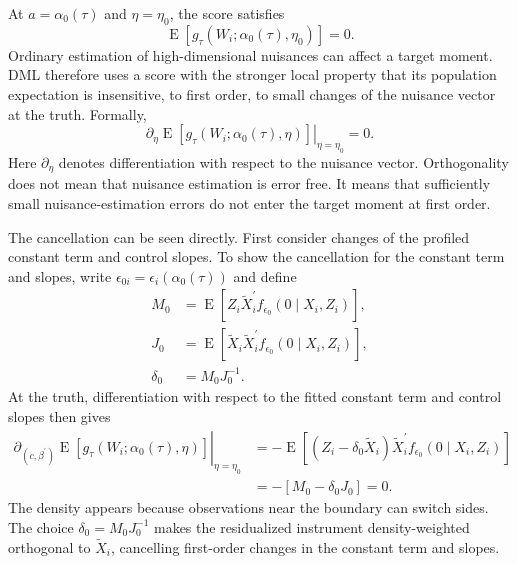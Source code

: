 At $a=\alpha_0(\tau)$ and $\eta=\eta_0$, the score satisfies
\begin{equation}
    \operatorname{E}\!\left[
        g_{\tau}\!\left(W_i;\alpha_0(\tau),\eta_0\right)
    \right]
    =0.
    \label{eq:orthogonal-score-moment}
\end{equation}
Ordinary estimation of high-dimensional nuisances can affect a target moment. DML therefore uses a score with the stronger local property that its population expectation is insensitive, to first order, to small changes of the nuisance vector at the truth. Formally,
\begin{equation}
    \left.
    \partial_{\eta}
    \operatorname{E}\!\left[
        g_{\tau}\!\left(W_i;\alpha_0(\tau),\eta\right)
    \right]
    \right|_{\eta=\eta_0}
    =0.
    \label{eq:neyman-orthogonality}
\end{equation}
Here $\partial_{\eta}$ denotes differentiation with respect to the nuisance vector. Orthogonality does not mean that nuisance estimation is error free. It means that sufficiently small nuisance-estimation errors do not enter the target moment at first order.

The cancellation can be seen directly. First consider changes of the profiled constant term and control slopes. To show the cancellation for the constant term and slopes, write $\epsilon_{0i}=\epsilon_i(\alpha_0(\tau))$ and define
\begin{equation}
    \begin{aligned}
        M_0
        &=\operatorname{E}\!\left[
            Z_i\widetilde X_i^{\prime}
            f_{\epsilon_0}(0\mid X_i,Z_i)
        \right],\\
        J_0
        &=\operatorname{E}\!\left[
            \widetilde X_i\widetilde X_i^{\prime}
            f_{\epsilon_0}(0\mid X_i,Z_i)
        \right],\\
        \delta_0&=M_0J_0^{-1}.
    \end{aligned}
    \label{eq:orthogonality-MJ}
\end{equation}
At the truth, differentiation with respect to the fitted constant term and control slopes then gives
\begin{equation}
    \begin{aligned}
        \left.
        \partial_{(c,\beta^{\prime})}
        \operatorname{E}\!\left[
            g_{\tau}\!\left(W_i;\alpha_0(\tau),\eta\right)
        \right]
        \right|_{\eta=\eta_0}
        &=-\operatorname{E}\!\left[
            (Z_i-\delta_0\widetilde X_i)\widetilde X_i^{\prime}
            f_{\epsilon_0}(0\mid X_i,Z_i)
        \right]\\
        &=-\left[M_0-\delta_0J_0\right]
        =0.
    \end{aligned}
    \label{eq:orthogonality-beta}
\end{equation}
The density appears because observations near the boundary can switch sides. The choice $\delta_0=M_0J_0^{-1}$ makes the residualized instrument density-weighted orthogonal to $\widetilde X_i$, cancelling first-order changes in the constant term and slopes.

